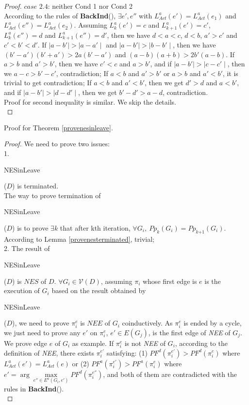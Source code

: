 \documentclass{acm_proc_article-sp}
\begin{document}
\begin{proof}
\textbf{$\textit{case 2.4}$}: neither Cond 1 nor Cond 2\\
According to the rules of \textbf{BackInd}(), $\exists e', e''$ with $L_{Act}^a(e')=L_{Act}^a(e_{1})$ and $L_{Act}^a(e'')=L_{Act}^a(e_{2})$. Assuming $L_{k}^a(e')=c$ and $L_{k+1}^a(e')=c'$,$L_{k}^a(e'')=d$ and $L_{k+1}^a(e'')=d'$, then we have $d<a<c$, $d<b$, $a'>c'$ and $c'<b'<d'$. If $\mid a-b'\mid >\mid a-a'\mid$ and $\mid a-b' \mid>\mid b-b'\mid$, then we have $(b'-a')(b'+a')>2a(b'-a')$ and $(a-b)(a+b)>2b'(a-b)$. If $a>b$ and $a'>b'$, then we have $c'<c$ and $a>b'$, and if $\mid a-b'\mid >\mid c-c'\mid$, then we $a-c>b'-c'$, contradiction; If $a<b$ and $a'>b'$ or $a>b$ and $a'<b'$, it is trivial to get contradiction; If $a<b$ and $a'<b'$, then we get $d'>d$ and $a<b'$, and if $\mid a-b'\mid >\mid d-d'\mid$, then we get $b'-d'>a-d$, contradiction.\\
Proof for second inequality is similar. We skip the details.\\
\end{proof}

Proof for Theorem \ref{provenesinleave}.
\begin{proof}
We need to prove two issues: \\
1. \begin{bf}NESinLeave\end{bf}($D$) is terminated.\\
The way to prove termination of \begin{bf}NESinLeave\end{bf}($D$) is to prove $\exists k$ that after kth iteration, $\forall G_{\textit{i}},~Pp_{\textit{k}}(G_{\textit{i}})= Pp_{\textit{k+1}}(G_{\textit{i}})$.
According to Lemma \ref{provenesterminated}, trivial;\\
2. The result of \begin{bf}NESinLeave\end{bf}($D$) is $\textit{NES}$ of $D$. $\forall G_{i}\in \mathcal{V}(D)$, assuming $\pi_{\textit{i}}$ whose first edge is $e$ is the execution of $G_{\textit{i}}$ based on the result obtained by \begin{bf}NESinLeave\end{bf}($D$), we need to prove $\pi_{\textit{i}}^e$ is $\textit{NEE}$ of $G_{\textit{i}}$ coinductively. As $\pi_{\textit{i}}^e$ is ended by a cycle, we just need to prove any $e'$ on $\pi_{\textit{i}}^e$, $e'\in E(G_{\textit{j}})$, is the first edge of \textit{NEE} of $G_{\textit{j}}$. We prove edge $e$ of $G_{\textit{i}}$ as example. If $\pi_{\textit{i}}^e$ is not \textit{NEE} of $G_{\textit{i}}$, according to the definition of \textit{NEE}, there exists $\pi_{\textit{i}}^{e'}$ satisfying:
(1) $PF^d(\pi_{\textit{i}}^{e'})> PF^d(\pi_{\textit{i}}^{e})$ where $L_{\textit{Act}}^a(e')= L_{\textit{Act}}^a(e)$ or
(2) $PF^a(\pi_{\textit{i}}^{e'})> PF^a(\pi_{\textit{i}}^{e})$ where $e'=\arg\underset{e''\in E^a(G_{\textit{i}},e')}{\max} PF^d(\pi_{\textit{i}}^{e''})$, and both of them are contradicted with the rules in \textbf{BackInd}().\\
\end{proof}
\end{document}
